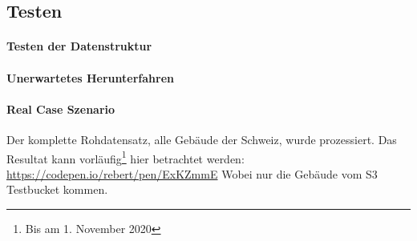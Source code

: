 \subsection{Testen}

\paragraph{Testen der Datenstruktur}


\paragraph{Unerwartetes Herunterfahren}


\paragraph{Real Case Szenario}

Der komplette Rohdatensatz, alle Gebäude der Schweiz, wurde prozessiert. Das Resultat kann vorläufig\footnote{Bis am 1. November 2020} hier betrachtet werden:
\href{https://codepen.io/rebert/pen/ExKZmmE}{https://codepen.io/rebert/pen/ExKZmmE} Wobei nur die Gebäude vom S3 Testbucket kommen.
